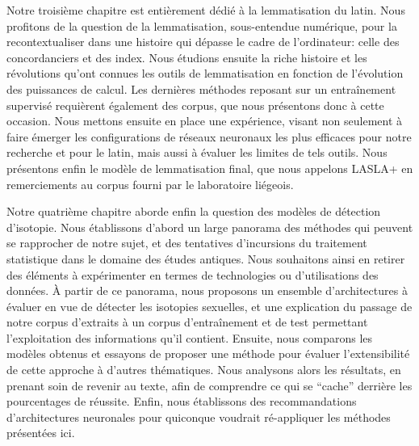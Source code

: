 Notre troisième chapitre est entièrement dédié à la lemmatisation du latin. Nous profitons de la question de la lemmatisation, sous-entendue numérique, pour la recontextualiser dans une histoire qui dépasse le cadre de l'ordinateur: celle des concordanciers et des index. Nous étudions ensuite la riche histoire et les révolutions qu'ont connues les outils de lemmatisation en fonction de l'évolution des puissances de calcul. Les dernières méthodes reposant sur un entraînement supervisé requièrent également des corpus, que nous présentons donc à cette occasion. Nous mettons ensuite en place une expérience, visant non seulement à faire émerger les configurations de réseaux neuronaux les plus efficaces pour notre recherche et pour le latin, mais aussi à évaluer les limites de tels outils. Nous présentons enfin le modèle de lemmatisation final, que nous appelons LASLA+ en remerciements au corpus fourni par le laboratoire liégeois.

Notre quatrième chapitre aborde enfin la question des modèles de détection d'isotopie. Nous établissons d'abord un large panorama des méthodes qui peuvent se rapprocher de notre sujet, et des tentatives d'incursions du traitement statistique dans le domaine des études antiques. Nous souhaitons ainsi en retirer des éléments à expérimenter en termes de technologies ou d'utilisations des données. À partir de ce panorama, nous proposons un ensemble d'architectures à évaluer en vue de détecter les isotopies sexuelles, et une explication du passage de notre corpus d'extraits à un corpus d'entraînement et de test permettant l'exploitation des informations qu'il contient. Ensuite, nous comparons les modèles obtenus et essayons de proposer une méthode pour évaluer l'extensibilité de cette approche à d'autres thématiques. Nous analysons alors les résultats, en prenant soin de revenir au texte, afin de comprendre ce qui se \enquote{cache} derrière les pourcentages de réussite. Enfin, nous établissons des recommandations d'architectures neuronales pour quiconque voudrait ré-appliquer les méthodes présentées ici.


% 

